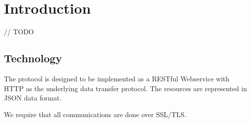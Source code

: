 \section{Introduction}

// TODO

\subsection{Technology}

The protocol is designed to be implemented as a RESTful Webservice with HTTP as the underlying data transfer protocol. The resources are represented in JSON data format.

We require that all communications are done over SSL/TLS.